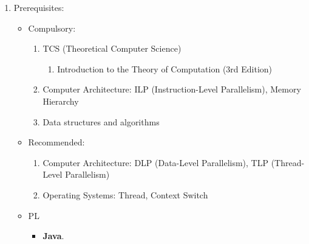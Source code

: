 \documentclass{article}
\begin{document}
\begin{enumerate}
    \item Prerequisites:
    \begin{itemize}
        \item Compulsory:
        \begin{enumerate}
        \item TCS (Theoretical Computer Science)
        \begin{enumerate}
            \item Introduction to the Theory of Computation (3rd Edition) \cite{sipser1996introduction}
        \end{enumerate}
        \item Computer Architecture: ILP (Instruction-Level Parallelism), Memory Hierarchy
        \item Data structures and algorithms
    \end{enumerate}
        \item Recommended:
        \begin{enumerate}
            \item Computer Architecture: DLP (Data-Level Parallelism), TLP (Thread-Level Parallelism)
            \item Operating Systems: Thread, Context Switch
        \end{enumerate}
        \item PL
        \begin{itemize}
            \item \textbf{Java}.
        \end{itemize}
    \end{itemize}
\end{enumerate}
\end{document}
